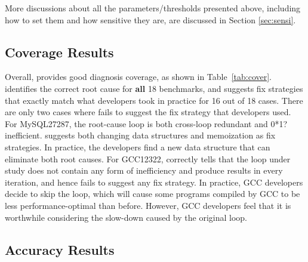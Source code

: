 More discussions about all the parameters/thresholds presented above, including
how to set them and how sensitive they are, are discussed in Section
\ref{sec:sensi}. 

\subsection{Coverage Results}
\label{sec:coverage}
Overall, \Tool provides good diagnosis coverage, as shown in Table~\ref{tab:cover}. 
\Tool identifies the correct root cause for \textbf{all} 18 benchmarks, and 
suggests fix strategies that exactly match what developers took in practice
for 16 out of 18 cases. There are only two cases where \Tool fails to suggest
the fix strategy that developers used. For MySQL27287, the root-cause loop
is both cross-loop redundant and 0*1? inefficient. \Tool suggests both changing
data structures and memoization as fix strategies. In practice, the developers
find a new data structure that can eliminate both root causes.
For GCC12322, \Tool correctly tells that the loop under study
does not contain any form of inefficiency and produce results in every 
iteration, and hence fails to suggest any fix strategy. In practice, GCC
developers decide to skip the loop, which will cause some programs compiled by
GCC
to be less performance-optimal than before. However, GCC developers feel
that it is worthwhile considering the slow-down caused by the original loop.

\subsection{Accuracy Results}
\label{sec:result_acc}

